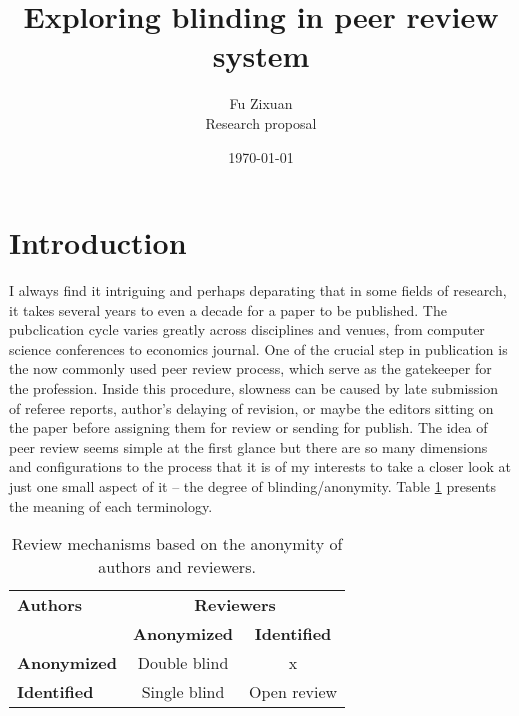 \documentclass[12pt]{article}
\title{Exploring blinding in peer review system}
\author{Fu Zixuan \\{\small {Research proposal}}}
\date{\today}
\begin{document}
\maketitle




\section{Introduction}
I always find it intriguing and perhaps deparating that in some fields of
research, it takes several years to even a decade for a paper to be published.
The pubclication cycle varies greatly across disciplines and venues, from
computer science conferences to economics journal\cite{hadavand2024publishing}.
One of the crucial step in publication is the now commonly used peer review
process, which serve as the gatekeeper for the profession. Inside this
procedure, slowness can be caused by late submission of referee reports,
author's delaying of revision, or maybe the editors sitting on the paper before
assigning them for review or sending for publish. The idea of peer review seems
simple at the first glance but there are so many dimensions and configurations
to the process\cite{soergel2013open} that it is of my interests to take a
closer look at just one small aspect of it -- the degree of blinding/anonymity.
Table \ref{tab:review_mechanism} presents the meaning of each terminology.
\begin{table}[h!]
    \centering
    \begin{tabular}{lcc}
        \toprule
        \textbf{Authors}    & \multicolumn{2}{c}{\textbf{Reviewers}}                       \\
        \cmidrule(lr){2-3}
                            & \textbf{Anonymized}                    & \textbf{Identified} \\
        \midrule
        \textbf{Anonymized} & Double blind                           & x                   \\
        \textbf{Identified} & Single blind                           & Open review         \\
        \bottomrule
    \end{tabular}
    \caption{Review mechanisms based on the anonymity of authors and reviewers.}
    \label{tab:review_mechanism}
\end{table}
\end{document}
